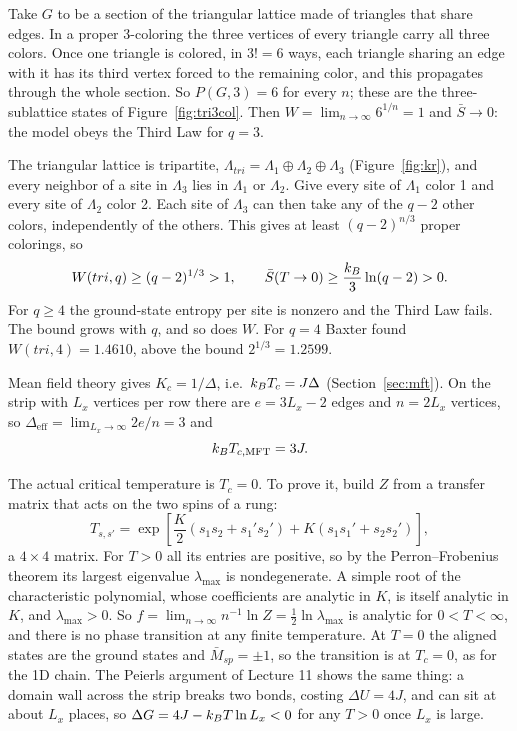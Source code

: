  Take $G$ to be a section of the triangular lattice made of triangles that share edges. In a proper
3-coloring the three vertices of every triangle carry all three colors. Once one triangle is colored, in $3! = 6$ ways,
each triangle sharing an edge with it has its third vertex forced to the remaining color, and this propagates through
the whole section. So $P(G,3) = 6$ for every $n$; these are the three-sublattice states of Figure~\ref{fig:tri3col}.
Then $W = \lim_{n\to\infty}6^{1/n} = 1$ and $\bar S\to 0$: the model obeys the Third Law for $q = 3$.

 The triangular lattice is tripartite, $\Lambda_{tri} = \Lambda_1\oplus\Lambda_2\oplus\Lambda_3$
(Figure~\ref{fig:kr}), and every neighbor of a site in $\Lambda_3$ lies in $\Lambda_1$ or $\Lambda_2$. Give every site
of $\Lambda_1$ color 1 and every site of $\Lambda_2$ color 2. Each site of $\Lambda_3$ can then take any of the $q-2$
other colors, independently of the others. This gives at least $(q-2)^{n/3}$ proper colorings, so
\begin{equation}
  W(tri,q)\ge(q-2)^{1/3}>1,\qquad \bar S(T\to 0)\ge\frac{k_{B}}{3}\ln(q-2)>0 .
\end{equation}
For $q\ge 4$ the ground-state entropy per site is nonzero and the Third Law fails. The bound grows with $q$, and so does
$W$. For $q = 4$ Baxter found $W(tri,4) = 1.4610$, above the bound $2^{1/3} = 1.2599$.

 Mean field theory gives $K_c = 1/\Delta$, i.e.\ $k_{B} T_c = J\Delta$ (Section~\ref{sec:mft}). On the strip
with $L_x$ vertices per row there are $e = 3L_x-2$ edges and $n = 2L_x$ vertices, so
$\Delta_{\text{eff}} = \lim_{L_x\to\infty}2e/n = 3$ and
\begin{equation}
  k_{B} T_{c,\text{MFT}} = 3J .
\end{equation}

 The actual critical temperature is $T_c = 0$. To prove it, build $Z$ from a transfer matrix that acts on
the two spins of a rung:
\begin{equation}
  T_{s,s'} = \exp\left[\frac{K}{2}(s_1s_2+s_1's_2')+K(s_1s_1'+s_2s_2')\right],
\end{equation}
a $4\times 4$ matrix. For $T>0$ all its entries are positive, so by the Perron--Frobenius theorem its largest
eigenvalue $\lambda_{\max}$ is nondegenerate. A simple root of the characteristic polynomial, whose coefficients are
analytic in $K$, is itself analytic in $K$, and $\lambda_{\max}>0$. So
$f = \lim_{n\to\infty}n^{-1}\ln Z = \frac{1}{2}\ln\lambda_{\max}$ is analytic for $0<T<\infty$, and there is no phase
transition at any finite temperature. At $T = 0$ the aligned states are the ground states and $\bar M_{sp} = \pm1$, so
the transition is at $T_c = 0$, as for the 1D chain. The Peierls argument of Lecture 11 shows the same thing: a domain
wall across the strip breaks two bonds, costing $\Delta U = 4J$, and can sit at about $L_x$ places, so
$\Delta G = 4J-k_{B} T\ln L_x<0$ for any $T>0$ once $L_x$ is large.

